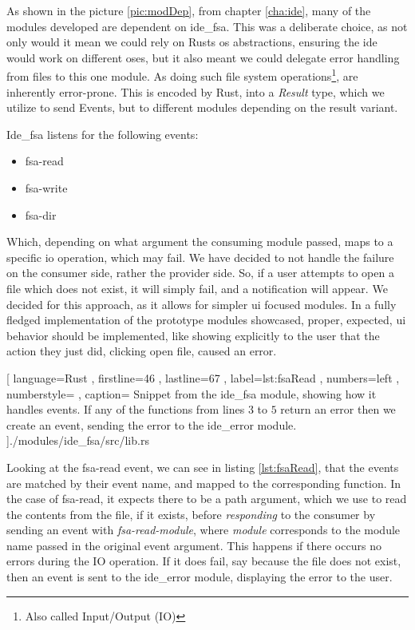 As shown in the picture \ref{pic:modDep}, from chapter \ref{cha:ide}, many of
the modules developed are dependent on ide\_fsa. This was a deliberate
choice, as not only would it mean we could rely on Rusts \gls*{os} abstractions,
ensuring the \gls*{ide} would work on different \gls*{os}es, but it also meant
we could delegate error handling from files to this one module. As doing such
file system operations\footnote{Also called Input/Output (IO)}, are inherently
error-prone. This is encoded by Rust, into a \textit{Result} type, which we
utilize to send Events, but to different modules depending on the result
variant.

Ide\_fsa listens for the following events:

\begin{itemize}
  \item fsa-read
  \item fsa-write
  \item fsa-dir
\end{itemize}

Which, depending on what argument the consuming module passed, maps to a
specific \gls*{io} operation, which may fail. We have decided to not handle the
failure on the consumer side, rather the provider side. So, if a user attempts
to open a file which does not exist, it will simply fail, and a notification
will appear. We decided for this approach, as it allows for simpler \gls*{ui}
focused modules. In a fully fledged implementation of the prototype modules
showcased, proper, expected, \gls*{ui} behavior should be implemented, like
showing explicitly to the user that the action they just did, clicking open
file, caused an error.

\begin{code}[H]
  
    [ language=Rust
    , firstline=46
    , lastline=67
    , label=lst:fsaRead
    , numbers=left
    , numberstyle=\tiny\color{gray}
    , caption={
      Snippet from the ide\_fsa module, showing how it handles events. If any of
      the functions from lines $3$ to $5$ return an error then we create an event,
      sending the error to the ide\_error module.
    }
    ]{./modules/ide\_fsa/src/lib.rs}
\end{code}

Looking at the fsa-read event, we can see in listing \ref{lst:fsaRead}, that the
events are matched by their event name, and mapped to the corresponding function.
In the case of fsa-read, it expects there to be a path argument, which we use to
read the contents from the file, if it exists, before \textit{responding} to the
consumer by sending an event with \textit{fsa-read-module}, where
\textit{module} corresponds to the module name passed in the original event
argument. This happens if there occurs no errors\footnotemark{} during the IO
operation. If it does fail, say because the file does not exist, then an event
is sent to the ide\_error module, displaying the error to the user.

